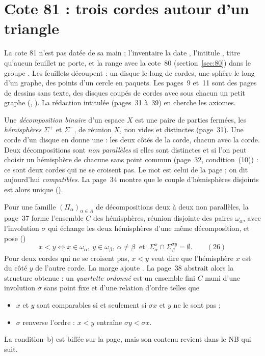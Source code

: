 \section[Cote 81 : trois cordes autour d'un triangle]{Cote 81 : trois cordes autour d'un triangle\protect{}}\label{sec:81}

La cote 81 n'est pas datée de sa main ; l'inventaire la date , l'intitule , titre qu'aucun feuillet ne porte, et la range avec la cote~80 (section~\ref{sec:80}) dans le groupe . Les feuillets découpent : un disque le long de cordes, une sphère le long d'un graphe, des points d'un cercle en paquets. Les pages~9 et~11 sont des pages de dessins sans texte, des disques coupés de cordes avec sous chacun un petit graphe (, ). La rédaction intitulée  (pages~31 à~39) en cherche les axiomes.

Une \emph{décomposition binaire} d'un espace $X$ est une paire de parties fermées, les \emph{hémisphères} $\Sigma^+$ et $\Sigma^-$, de réunion $X$, non vides et distinctes (page~31). Une corde d'un disque en donne une : les deux côtés de la corde, chacun avec la corde. Deux décompositions sont \emph{non parallèles} si elles sont distinctes et si l'on peut choisir un hémisphère de chacune sans point commun (page~32, condition~(10)) : ce sont deux cordes qui ne se croisent pas. Le mot  est celui de la page ; on dit aujourd'hui \emph{compatibles}. La page~34 montre que le couple d'hémisphères disjoints est alors unique ().

Pour une famille $(\Pi_\alpha)_{\alpha \in A}$ de décompositions deux à deux non parallèles, la page~37 forme l'ensemble $C$ des hémisphères, réunion disjointe des paires $\omega_\alpha$, avec l'involution $\sigma$ qui échange les deux hémisphères d'une même décomposition, et pose ()
\[
x < y \iff x \in \omega_\alpha,\ y \in \omega_\beta,\ \alpha \neq \beta \ \text{ et } \ \Sigma^x_\alpha \cap \Sigma^{\sigma y}_\beta = \emptyset. \qquad (26)
\]
Pour deux cordes qui ne se croisent pas, $x < y$ veut dire que l'hémisphère $x$ est du côté $y$ de l'autre corde. La marge ajoute . La page~38 abstrait alors la structure obtenue : un \emph{quartette ordonné} est un ensemble fini $C$ muni d'une involution $\sigma$ sans point fixe et d'une relation d'ordre telles que
\begin{itemize}
\item[a)] $x$ et $y$ sont comparables si et seulement si $\sigma x$ et $y$ ne le sont pas ;
\item[b)] $\sigma$ renverse l'ordre : $x < y$ entraîne $\sigma y < \sigma x$.
\end{itemize}
La condition~b) est biffée sur la page, mais son contenu revient dans le NB qui suit.

